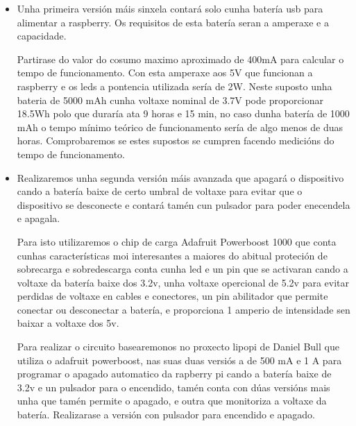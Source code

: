 \begin{itemize}
    \item Unha primeira versión máis sinxela contará solo cunha batería usb para alimentar a raspberry. Os requisitos de esta batería seran a amperaxe e a capacidade.

    Partirase do valor do cosumo maximo aproximado de 400mA para calcular o tempo de funcionamento. Con esta amperaxe aos 5V que funcionan a raspberry e os leds a pontencia utilizada sería de 2W. Neste suposto unha bateria de  5000 mAh cunha voltaxe nominal de 3.7V pode proporcionar 18.5Wh polo que duraría ata 9 horas e 15 min, no caso dunha batería de 1000 mAh o tempo mínimo teórico de funcionamento sería de algo menos de duas horas.
    Comprobaremos se estes supostos se cumpren facendo medicións do tempo de funcionamento.

    \item Realizaremos unha segunda versión máis avanzada que apagará o dispositivo cando a batería baixe de certo umbral de voltaxe para evitar que o dispositivo se desconecte e contará tamén cun pulsador para poder enecendela e apagala.

    Para isto utilizaremos o  chip de carga Adafruit Powerboost 1000 que conta cunhas características moi interesantes a maiores do abitual proteción de sobrecarga e sobredescarga conta cunha led e un pin que se activaran cando a voltaxe da batería baixe dos 3.2v, unha voltaxe opercional de 5.2v para evitar perdidas de voltaxe en cables e conectores, un pin abilitador que permite conectar ou desconectar a batería, e proporciona 1 amperio de intensidade sen baixar a voltaxe dos 5v.

    Para realizar o circuito basearemonos no proxecto lipopi de Daniel Bull que utiliza o adafruit powerboost, nas suas duas versiós a de 500 mA e 1 A para programar o apagado automatico da rapberry pi cando a batería baixe de 3.2v e un pulsador para o encendido, tamén conta con dúas versións mais unha que tamén permite o apagado, e outra que monitoriza a voltaxe da batería. Realizarase a versión con pulsador para encendido e apagado.


\end{itemize}
